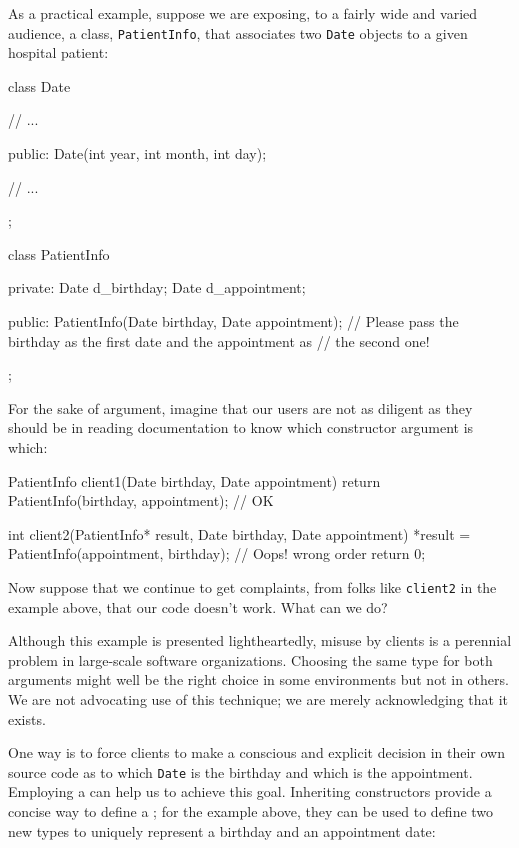 As a practical example, suppose we are exposing, to a fairly wide and varied audience, a class,
\lstinline!PatientInfo!, that associates two \lstinline!Date! objects to a
given hospital patient:

\begin{emcppslisting}[emcppsbatch=e5]
class Date
{
    // ...

public:
    Date(int year, int month, int day);

    // ...
};

class PatientInfo
{
private:
    Date d_birthday;
    Date d_appointment;

public:
    PatientInfo(Date birthday, Date appointment);
        // Please pass the birthday as the first date and the appointment as
        // the second one!
};
\end{emcppslisting}
    
\noindent For the sake of argument, imagine that our users are not as diligent as
they should be in reading documentation to know which constructor
argument is which:

\begin{emcppslisting}[emcppsbatch=e5]
PatientInfo client1(Date birthday, Date appointment)
{
    return PatientInfo(birthday, appointment);  // OK
}

int client2(PatientInfo* result, Date birthday, Date appointment)
{
    *result = PatientInfo(appointment, birthday);  // Oops! wrong order
    return 0;
}
\end{emcppslisting}
    
\noindent Now suppose that we continue to get complaints, from folks like
\lstinline!client2! in the example above, that our code doesn't work. What can we
do?

Although this example is presented lightheartedly, misuse by clients is a perennial problem in large-scale
software organizations. Choosing the same type for both arguments
might well be the right choice in some environments but not in others.
We are not advocating use of this technique; we are merely
  acknowledging that it exists.

One way is to force clients to make a conscious and explicit decision in
their own source code as to which \lstinline!Date! is the birthday and
which is the appointment. Employing a 
can help us to achieve this goal. Inheriting constructors provide a
concise way to define a ; for
the example above, they can be used to define two new types to
 uniquely represent a birthday and an appointment date:

